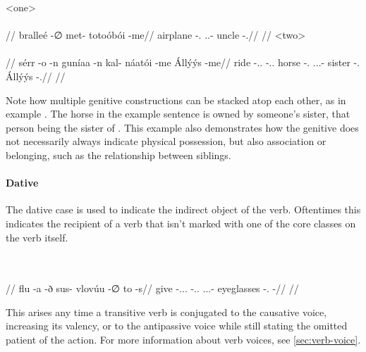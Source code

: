 	\a<one>\begingl
		\glpreamble{}\\
		\\
		//
		\gla bralleé -∅ met- totoóbói -me//
		\glb airplane -\Dir.\Sg{} \Fps.\Poss.\Inal- uncle -\Gen.\Sg//
		\glft {}//
	\endgl
	\a<two>\begingl
		\glpreamble{}\\
		\\
		//
		\gla sérr -o -n guníaa -n kal- náatói -me Állýýs -me//
		\glb ride -\At.\Dir.\Fps{} -\Idr.\Tps.\Prox{} horse -\Idr.\Sg{} \Tps.\Obv.\Poss.\Inal- sister -\Gen.\Sg{} Állýýs -\Gen.\Sg//
		\glft {}//
	\endgl
\xe

Note how multiple genitive constructions can be stacked atop each other, as in example . The horse in the example sentence is owned by someone's sister, that person being the sister of . This example also demonstrates how the genitive does not necessarily always indicate physical possession, but also association or belonging, such as the relationship between siblings.


\paragraph{Dative}

The dative case is used to indicate the indirect object of the verb. Oftentimes this indicates the recipient of a verb that isn't marked with one of the core classes on the verb itself.

	\begingl
		\glpreamble{}\\
		\\
		//
		\gla flu -a -ð sus- vlovúu -∅ to -s//
		\glb give -\At.\Dir.\Tps.\Prox{} -\Idr.\Tps.\Obv{} \Tps.\Prox.\Poss.\Ali- eyeglasses -\Dir.\Sg{} \Sps{} -\Dat//
		\glft {}//
	\endgl
\xe

This arises any time a transitive verb is conjugated to the causative voice, increasing its valency, or to the antipassive voice while still stating the omitted patient of the action. For more information about verb voices, see \autoref{sec:verb-voice}.

